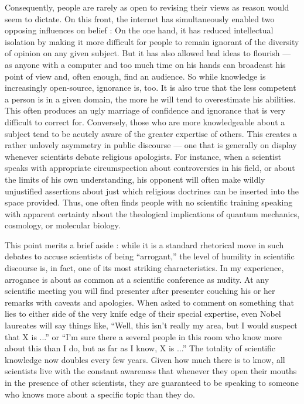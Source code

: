 \documentclass[a4paper,14pt]{extarticle}
\begin{document}
Consequently, people are rarely as open to revising their views as reason would seem to dictate.
On this front, the internet has simultaneously enabled two opposing influences on belief :
On the one hand, it has reduced intellectual isolation by making it more difficult for people to remain ignorant of the diversity of opinion on any given subject.
But it has also allowed bad ideas to flourish --- as anyone with a computer and too much time on his hands can broadcast his point of view and, often enough, find an audience.
So while knowledge is increasingly open-source, ignorance is, too.
It is also true that the less competent a person is in a given domain, the more he will tend to overestimate his abilities.
This often produces an ugly marriage of confidence and ignorance that is very difficult to correct for.
Conversely, those who are more knowledgeable about a subject tend to be acutely aware of the greater expertise of others.
This creates a rather unlovely asymmetry in public discourse --- one that is generally on display whenever scientists debate religious apologists.
For instance, when a scientist speaks with appropriate circumspection about controversies in his field, or about the limits of his own understanding, his opponent will often make wildly unjustified assertions about just which religious doctrines can be inserted into the space provided.
Thus, one often finds people with no scientific training speaking with apparent certainty about the theological implications of quantum mechanics, cosmology, or molecular biology.

This point merits a brief aside :
while it is a standard rhetorical move in such debates to accuse scientists of being ``arrogant,'' the level of humility in scientific discourse is, in fact, one of its most striking characteristics.
In my experience, arrogance is about as common at a scientific conference as nudity.
At any scientific meeting you will find presenter after presenter couching his or her remarks with caveats and apologies.
When asked to comment on something that lies to either side of the very knife edge of their special expertise, even Nobel laureates will say things like, ``Well, this isn’t really my area, but I would suspect that X is ...'' or ``I’m sure there a several people in this room who know more about this than I do, but as far as I know, X is ...''
The totality of scientific knowledge now doubles every few years.
Given how much there is to know, all scientists live with the constant awareness that whenever they open their mouths in the presence of other scientists, they are guaranteed to be speaking to someone who knows more about a specific topic than they do.
\end{document}
